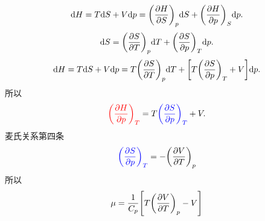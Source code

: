 \begin{questions}
\begin{solution}
\begin{equation}
    \end{equation}
    \begin{equation}
      \dd H = T\dd S + V\dd p =  \qty(\pdv{H}{S})_p\dd S + \qty(\pdv{H}{p})_S\dd p.
    \end{equation}
    \begin{equation}
      \dd S = \qty(\pdv{S}{T})_p \dd T + \qty(\pdv{S}{p})_T \dd p.
    \end{equation}
    \begin{equation}
      \dd H = T\dd S + V\dd p = T\qty(\pdv{S}{T})_p\dd T + \qty[T\qty(\pdv{S}{p})_T+V]\dd p.
    \end{equation}
    所以
    \begin{equation}
      {\color{red}\qty(\pdv{H}{p})_T} = T{\color{blue}\qty(\pdv{S}{p})_T}+V.
    \end{equation}
    麦氏关系第四条
    \begin{equation}
      {\color{blue}\qty(\pdv{S}{p})_T} = -\qty(\pdv{V}{T})_p
    \end{equation}
    所以
    \begin{equation}
      \mu = \frac{1}{C_p}\qty[T\qty(\pdv{V}{T})_p - V]
    \end{equation}
  \end{solution}
\end{questions}
